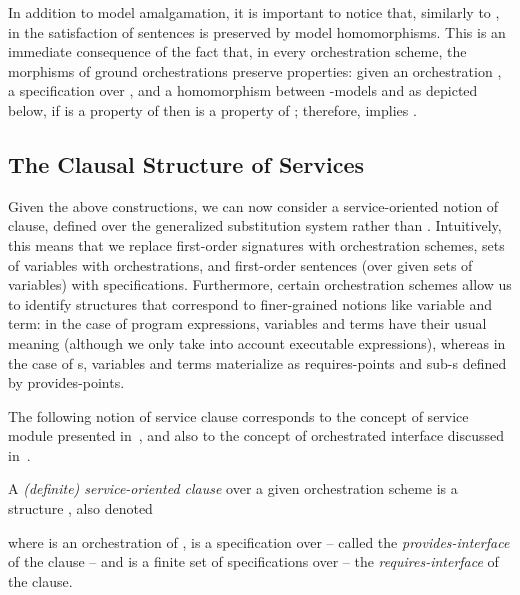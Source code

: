 \documentclass{LMCS}
\begin{document}
  \begin{rem}
    \label{remark:preservation-of-satisfaction-in-OrcScheme}
    In addition to model amalgamation, it is important to notice that, similarly to , in  the satisfaction of sentences is preserved by model homomorphisms.
    This is an immediate consequence of the fact that, in every orchestration scheme, the morphisms of ground orchestrations preserve properties: given an orchestration , a specification  over , and a homomorphism  between \nb-models  and  as depicted below, if  is a property of  then  is a property of ; therefore,  implies .
    
  \end{rem}


  \subsection{The Clausal Structure of Services}

  Given the above constructions, we can now consider a service-oriented notion of clause, defined over the generalized substitution system  rather than .
  Intuitively, this means that we replace first-order signatures with orchestration schemes, sets of variables with orchestrations, and first-order sentences (over given sets of variables) with specifications.  Furthermore, certain orchestration schemes allow us to identify structures that correspond to finer-grained notions like variable and term: in the case of program expressions, variables and terms have their usual meaning (although we only take into account executable expressions), whereas in the case of s, variables and terms materialize as requires-points and sub-s defined by provides-points.

  The following notion of service clause corresponds to the concept of service module presented in~\cite{Fiadeiro-Lopes-Bocchi:An-abstract-model-for-service-discovery-and-binding-2011}, and also to the concept of orchestrated interface discussed in~\cite{Fiadeiro-Lopes:An-interface-theory-for-service-oriented-design-2013}.

  \begin{defi}
    A \emph{(definite) service-oriented clause} over a given orchestration scheme  is a structure , also denoted
    
    where  is an orchestration of ,  is a specification over  -- called the \emph{provides-interface} of the clause -- and  is a finite set of specifications over  -- the \emph{requires-interface} of the clause.
  \end{defi}
\end{document}
